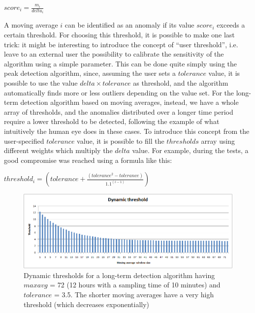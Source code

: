 \documentclass[12pt,a4paper,cucitura]{toptesi}
\begin{document}
\begin{center}
\Large
$score_i = \frac{m_i}{delta_i}$
\end{center}

A moving average $i$ can be identified as an anomaly if its value $score_i$ exceeds a certain threshold. For choosing this threshold, it is possible to make one last trick: it might be interesting to introduce the concept of ``user threshold'', i.e. leave to an external user the possibility to calibrate the sensitivity of the algorithm using a simple parameter.
This can be done quite simply using the peak detection algorithm, since, assuming the user sets a $tolerance$ value, it is possible to use the value $delta \times tolerance$ as threshold, and the algorithm automatically finds more or less outliers depending on the value set.
For the long-term detection algorithm based on moving averages, instead, we have a whole array of thresholds, and the anomalies distributed over a longer time period require a lower threshold to be detected, following the example of what intuitively the human eye does in these cases.
To introduce this concept from the user-specified $tolerance$ value, it is possible to fill the $thresholds$ array using different weights which multiply the $delta$ value. For example, during the tests, a good compromise was reached using a formula like this:

\begin{center}
\Large
$threshold_i = (tolerance + \frac{(tolerance^2 - tolerance)}{1.1^{(i-1)}})$
\end{center}

\begin{figure}
\centering
\includegraphics[width=\linewidth]{threshold.png}
\caption[Dynamic thresholds]{Dynamic thresholds for a long-term detection algorithm having $maxavg$ = 72 (12 hours with a sampling time of 10 minutes) and $tolerance$ = 3.5. The shorter moving averages have a very high threshold (which decreases exponentially)}
\end{figure}
\end{document}

